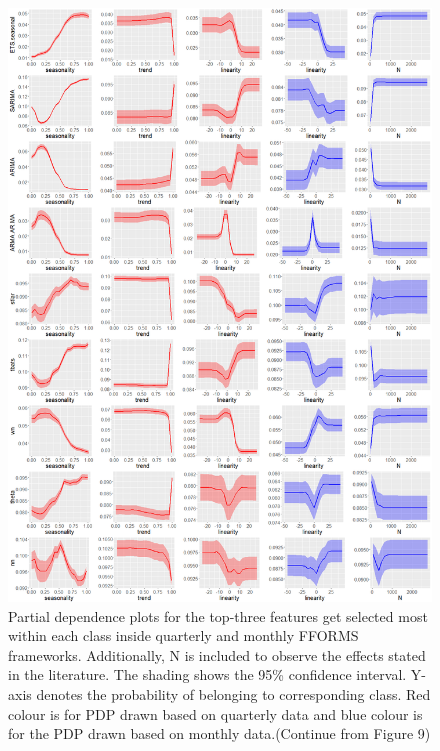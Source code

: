 \documentclass[11pt,a4paper,]{article}
\begin{document}
\begin{figure}
\centering
\includegraphics{figures/pdpquarterly2-1.png}
\caption{\label{fig:pdpquarterly2}Partial dependence plots for the top-three
features get selected most within each class inside quarterly and
monthly FFORMS frameworks. Additionally, N is included to observe the
effects stated in the literature. The shading shows the 95\% confidence
interval. Y-axis denotes the probability of belonging to corresponding
class. Red colour is for PDP drawn based on quarterly data and blue
colour is for the PDP drawn based on monthly data.(Continue from Figure
9)}
\end{figure}

\newpage
\end{document}
